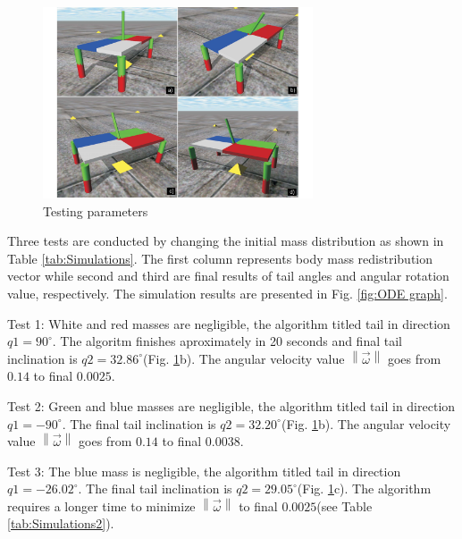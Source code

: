 \begin{figure}
	\centering
	\includegraphics[width=80mm]{./pictures/ODE_simulations.pdf}
	\caption{Testing parameters}
	\label{fig:ODESimulations}
\end{figure}

Three tests are conducted by changing the initial mass distribution as shown in Table \ref{tab:Simulations}. The first column represents body mass redistribution vector while second and third are final results of tail angles and angular rotation value, respectively. The simulation results are presented in Fig. \ref{fig:ODE graph}. 

Test 1: White and red masses are negligible, the algorithm titled tail in direction $q1=90^{\circ}$. The algoritm finishes aproximately in 20 seconds and final tail inclination is $q2=32.86^{\circ}$(Fig. \ref{fig:ODESimulations}b). The angular velocity value $\left \| \vec{\omega} \right \|$ goes from $0.14$ to final $0.0025$.

Test 2: Green and blue masses are negligible, the algorithm titled tail in direction $q1=-90^{\circ}$. The final tail inclination is $q2=32.20^{\circ}$(Fig. \ref{fig:ODESimulations}b). The angular velocity value $\left \| \vec{\omega} \right \|$ goes from $0.14$ to final $0.0038$. 

Test 3: The blue mass is negligible, the algorithm titled tail in direction $q1=-26.02^{\circ}$. The final tail inclination is $q2=29.05^{\circ}$(Fig. \ref{fig:ODESimulations}c). The algorithm requires a longer time to minimize $\left \| \vec{\omega} \right \|$ to final $0.0025$(see Table \ref{tab:Simulations2}).


